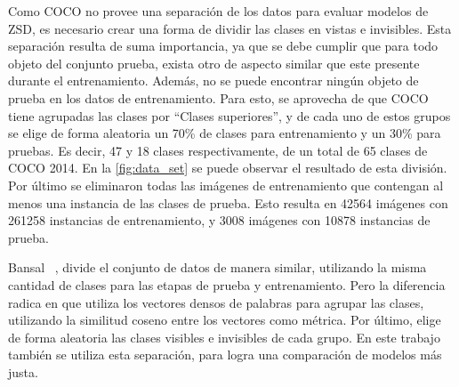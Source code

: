 Como COCO no provee una separación de los datos para evaluar modelos de ZSD, es necesario crear una forma de dividir las clases en vistas e invisibles. Esta separación resulta de suma importancia, ya que se debe cumplir que para todo objeto del conjunto prueba, exista otro de aspecto similar que este presente durante el entrenamiento. Además, no se puede encontrar ningún objeto de prueba en los datos de entrenamiento. Para esto, se aprovecha de que COCO tiene agrupadas las clases por ``Clases superiores'', y de cada uno de estos grupos se elige de forma aleatoria un 70\% de clases para entrenamiento y un 30\% para pruebas. Es decir, 47 y 18 clases respectivamente, de un total de 65 clases de COCO 2014. En la \autoref{fig:data_set} se puede observar el resultado de esta división. Por último se eliminaron todas las imágenes de entrenamiento que contengan al menos una instancia de las clases de prueba. Esto resulta en 42564 imágenes con 261258 instancias de entrenamiento, y 3008 imágenes con 10878 instancias de prueba. 

Bansal \etal~\cite{bansal2018zero}, divide el conjunto de datos de manera similar, utilizando la misma cantidad de clases para las etapas de prueba y entrenamiento. Pero la diferencia radica en que utiliza los vectores densos de palabras para agrupar las clases, utilizando la  similitud coseno entre los vectores como métrica. Por último, elige de forma aleatoria las clases visibles e invisibles de cada grupo. En este trabajo también se utiliza esta separación, para logra una comparación de modelos más justa.

